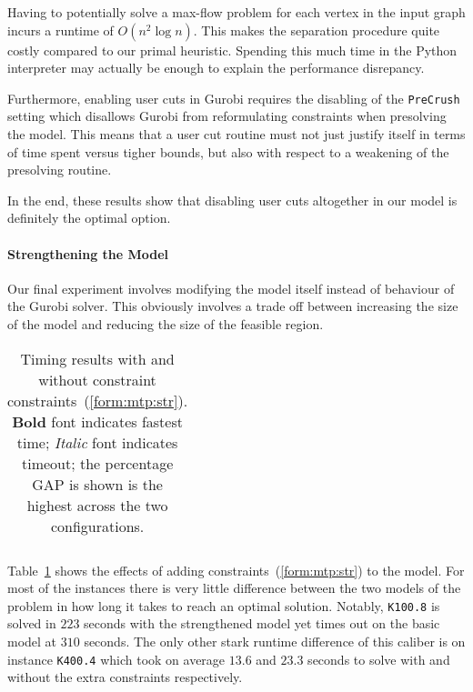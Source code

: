 Having to potentially solve a max-flow problem for each vertex in the input graph incurs a runtime
of $O(n^2 \log n)$. This makes the separation procedure quite costly compared
to our primal heuristic.
Spending this much time in the Python interpreter may actually be enough to explain the performance
disrepancy.

Furthermore, enabling user cuts in Gurobi requires the disabling of the \texttt{PreCrush} setting
which disallows Gurobi from reformulating constraints when presolving the model. This means
that a user cut routine must not just justify itself in terms of time spent versus tigher bounds,
but also with respect to a weakening of the presolving routine.

In the end, these results show that disabling user cuts altogether in our model is definitely
the optimal option.

\paragraph{Strengthening the Model}
Our final experiment involves modifying the model itself instead of behaviour of the Gurobi solver.
This obviously involves a trade off between increasing the size of the model and reducing the size
of the feasible region.

\begin{table}[h!]
  \centering
  \begin{tabular}[h!]{|c|c|c|c|c|}\hline
    
  \end{tabular}
  \caption{Timing results with and without constraint constraints~(\ref{form:mtp:str}).
    \textbf{Bold} font indicates fastest time;
    \textit{Italic} font indicates
    timeout; the percentage GAP is shown is the highest across the two configurations.} 
  \label{tab:jmp:strengthen}
\end{table}

Table~\ref{tab:jmp:strengthen} shows the effects of adding constraints~(\ref{form:mtp:str}) to
the model. For most of the instances there is very little difference between the two models
of the problem in how long it takes to reach an optimal solution. Notably, \texttt{K100.8} is
solved in $223$ seconds with the strengthened model yet times out on the basic model at $310$
seconds. The only other stark runtime difference of this caliber is on instance \texttt{K400.4}
which took on average $13.6$ and $23.3$ seconds to solve with and without the extra constraints
respectively.


